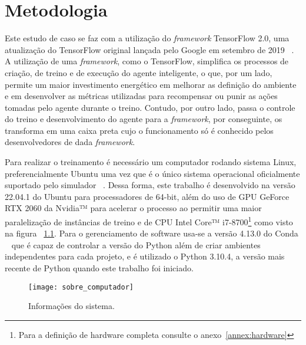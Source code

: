 

\chapter{Metodologia}
\label{cap:metodologia}

Este estudo de caso se faz com a utilização do \emph{framework} TensorFlow 2.0, uma atualização do TensorFlow original lançada pelo Google em setembro de 2019 ~\citep{TensorFlow2-release}. A utilização de uma \emph{framework}, como o TensorFlow, simplifica os processos de criação, de treino e de execução do agente inteligente, o que, por um lado, permite um maior investimento energético em melhorar as definição do ambiente e em desenvolver as métricas utilizadas para recompensar ou punir as ações tomadas pelo agente durante o treino. Contudo, por outro lado, passa o controle do treino e desenvolvimento do agente para a \emph{framework}, por conseguinte, os transforma em uma caixa preta cujo o funcionamento só é conhecido pelos desenvolvedores de dada \emph{framework}.

Para realizar o treinamento é necessário um computador rodando sistema Linux, preferencialmente Ubuntu uma vez que é o único sistema operacional oficialmente suportado pelo simulador ~\citep{Duckietown-requerimentos}. Dessa forma, este trabalho é desenvolvido na versão 22.04.1 do Ubuntu para processadores de 64-bit, além do uso de GPU GeForce RTX 2060 da Nvidia™ para acelerar o processo ao permitir uma maior paralelização de instâncias de treino e de CPU Intel Core™ i7-8700\footnote{Para a definição de hardware completa consulte o anexo~\ref{annex:hardware}} como visto na figura ~\ref{fig:sobre_computador}. Para o gerenciamento de software usa-se a versão 4.13.0 do Conda ~\citep{Anaconda} que é capaz de controlar a versão do Python além de criar ambientes independentes para cada projeto, e é utilizado o Python 3.10.4, a versão mais recente de Python quando este trabalho foi iniciado.

\begin{figure}
	\centering
	\texttt{[image: sobre\_computador]}
	\caption{Informações do sistema. \label{fig:sobre_computador}}
\end{figure}

